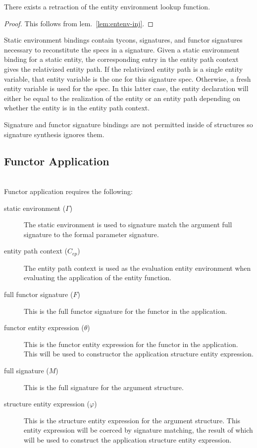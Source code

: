 \begin{lemma}
There exists a retraction of the entity environment lookup function.
\end{lemma}
\begin{proof}
This follows from lem.~\ref{lem:entenv-inj}. 
\end{proof}
      
Static environment bindings contain tycons, signatures, and functor signatures necessary to reconstitute the specs in a signature. Given a static environment binding for a static entity, the corresponding entry in the entity path context gives the relativized entity path. If the relativized entity path is a single entity variable, that entity variable is the one for this signature spec. Otherwise, a fresh entity variable is used for the spec. In this latter case, the entity declaration will either be equal to the realization of the entity or an entity path depending on whether the entity is in the entity path context. 
 
Signature and functor signature bindings are not permitted inside of structures so signature synthesis ignores them.        

\subsection{Functor Application}
\\
Functor application requires the following:
\begin{description}
\item[static environment ($\Gamma$)] The static environment is used to signature match the argument full signature to the formal parameter signature.
\item[entity path context ($C_{ep}$)] The entity path context is used as the evaluation entity environment when evaluating the application of the entity function.
\item[full functor signature ($F$)] This is the full functor signature for the functor in the application.
\item[functor entity expression ($\theta$)] This is the functor entity expression for the functor in the application. This will be used to constructor the application structure entity expression. 
\item[full signature ($M$)] This is the full signature for the argument structure. 
\item[structure entity expression ($\varphi$)] This is the structure entity expression for the argument structure. This entity expression will be coerced by signature matching, the result of which will be used to construct the application structure entity expression. 
\end{description}

